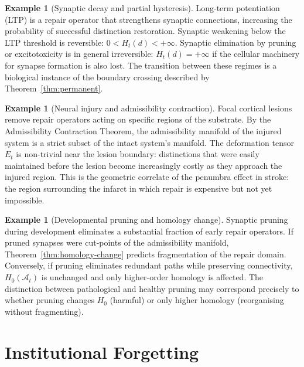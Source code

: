 \documentclass[12pt, oneside]{article}
\theoremstyle{plain}
\theoremstyle{definition}
\newtheorem{example}[theorem]{Example}
\theoremstyle{remark}
\newcommand{\At}{\mathcal{A}_t}
\newcommand{\Et}{E_t}
\newcommand{\Hyster}{H}
\begin{document}
\begin{example}[Synaptic decay and partial hysteresis]
  Long-term potentiation (LTP) is a repair operator that
  strengthens synaptic connections, increasing the probability of
  successful distinction restoration.
  Synaptic weakening below the LTP threshold is reversible:
  $0 < \Hyster_t(d) < +\infty$.
  Synaptic elimination by pruning or excitotoxicity is in general
  irreversible: $\Hyster_t(d) = +\infty$ if the cellular
  machinery for synapse formation is also lost.
  The transition between these regimes is a biological instance of
  the boundary crossing described by Theorem~\ref{thm:permanent}.
\end{example}

\begin{example}[Neural injury and admissibility contraction]
  Focal cortical lesions remove repair operators acting on specific
  regions of the substrate.
  By the Admissibility Contraction Theorem, the admissibility
  manifold of the injured system is a strict subset of the intact
  system's manifold.
  The deformation tensor $\Et$ is non-trivial near the lesion
  boundary: distinctions that were easily maintained before the
  lesion become increasingly costly as they approach the injured
  region.
  This is the geometric correlate of the penumbra effect in
  stroke: the region surrounding the infarct in which repair is
  expensive but not yet impossible.
\end{example}

\begin{example}[Developmental pruning and homology change]
  Synaptic pruning during development eliminates a substantial
  fraction of early repair operators.
  If pruned synapses were cut-points of the admissibility manifold,
  Theorem~\ref{thm:homology-change} predicts fragmentation of the
  repair domain.
  Conversely, if pruning eliminates redundant paths while
  preserving connectivity, $H_0(\At)$ is unchanged and only
  higher-order homology is affected.
  The distinction between pathological and healthy pruning may
  correspond precisely to whether pruning changes $H_0$ (harmful)
  or only higher homology (reorganising without fragmenting).
\end{example}


\section{Institutional Forgetting}
\label{sec:institutional}
\end{document}
